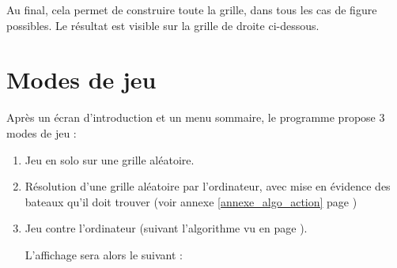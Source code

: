 Au final, cela permet de construire toute la grille, dans tous les cas de figure possibles. Le résultat est visible sur la grille de droite ci-dessous.




\newpage
\section{Modes de jeu}
Après un écran d'introduction et un menu sommaire, le programme propose 3 modes de jeu :
\begin{enumerate}
\item Jeu en solo sur une grille aléatoire.
\item Résolution d'une grille aléatoire par l'ordinateur, avec mise en évidence des bateaux qu'il doit trouver (voir annexe \ref{annexe_algo_action} page \pageref{annexe_algo_action})
\item Jeu contre l'ordinateur (suivant l'algorithme vu en page \pageref{alogo_jeu}).

L'affichage sera alors le suivant :


\end{enumerate}
